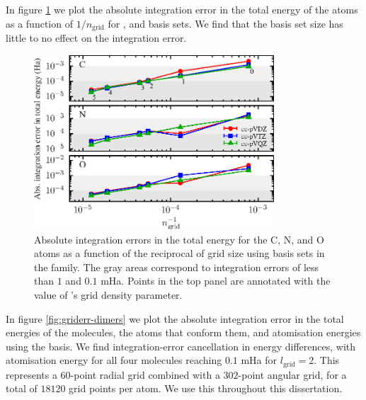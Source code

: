 In figure \ref{fig:griderr-atoms} we plot the absolute integration error in the total energy of the atoms as a function of $1/n_\mathrm{grid}$ for \vdz, \vtz and \vqz basis sets. We find that the basis set size has little to no effect on the integration error.

\begin{figure}[htbp]
    \centering
    \includegraphics[width=0.8\textwidth]{figures/optimisation/Fig/griderr-atoms}
    \caption{Absolute integration errors in the total energy for the C, N, and O atoms as a function of the reciprocal of grid size using basis sets in the  family. The gray areas correspond to integration errors of less than $1$ and $0.1$ mHa. Points in the top panel are annotated with the value of \pyscf's grid density parameter.}
    \label{fig:griderr-atoms}
\end{figure}

In figure \ref{fig:griderr-dimers} we plot the absolute integration error in the total energies of the molecules, the atoms that conform them, and atomisation energies using the \vdz basis. We find integration-error cancellation in energy differences, with atomisation energy for all four molecules reaching $0.1$ mHa for $l_\mathrm{grid}=2$. This represents a $60$-point radial grid combined with a $302$-point angular grid, for a total of $18120$ grid points per atom. We use this throughout this dissertation.

